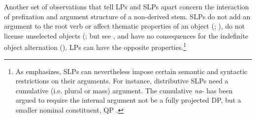 \documentclass[output=paper,colorlinks,citecolor=brown]{langscibook}
\begin{document}






%


Another set of observations that tell LPs and SLPs apart concern the interaction of prefixation and argument structure of a non-derived stem. SLPs do not add an argument to the root verb or affect thematic properties of an object (\citealt{Romanova2004,Romanova2007}; \citealt{Ramchand2004}), do not license unselected objects (\citealt{BabkoMalaya1999,Svenonius2004,Romanova2007}; but see \citealt{Zaucer2009,Zaucer2010,Zaucer2012}, and have no consequences for the indefinite object alternation (\citealt{BabkoMalaya1999,Svenonius2004}). LPs can have the opposite properties.\footnote{As \citet[][20--23]{Biskup2019} emphasizes, SLPs can nevertheless impose certain semantic and syntactic restrictions on their arguments. For instance, distributive SLPs need a cumulative (i.e. plural or mass) argument. The cumulative \textit{na}- has been argued to require the internal argument not be a fully projected DP, but a smaller nominal constituent, QP \citep{Pereltsvaig2006}.}
\end{document}
